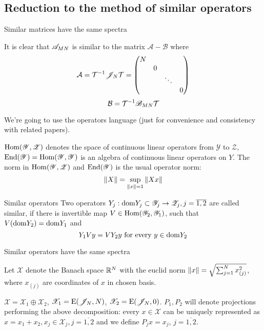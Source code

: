 \documentclass{article}
\begin{document}
\subsection{Reduction to the method of similar operators}

\begin{propose}
    Similar matrices have the same spectra
\end{propose}

It is clear that \( \mathscr{A}_{{M}{N}} \) is similar to the matrix \( \mathcal A - \mathcal B \) where
\[\mathcal A = {\mathcal T}^{-1}{\mathscr{J}_{N}}{\mathcal T}
= \begin{pmatrix}
    N &   &        & \\
      & 0 &        & \\
      &   & \ddots & \\
      &   &        & 0
\end{pmatrix}\]
\[\mathcal B = {\mathcal T}^{-1}{\mathscr{B}_{{M}{N}}}{\mathcal T}\]


We're going to use the operators language (just for convenience and consistency with related papers).

\( \mathrm{Hom}({\mathscr Y},{\mathscr Z}) \) denotes the space of continuous linear operators
from \( \mathscr Y \) to \( \mathscr Z \),
\( \mathrm{End}({\mathscr Y}) = \mathrm{Hom}({\mathscr Y},{\mathscr Y}) \) is an algebra of continuous linear operators on \( Y \).
The norm in \( \mathrm{Hom}({\mathscr Y},{\mathscr Z}) \) and \( \mathrm{End}({\mathscr Y}) \) is the usual operator norm:
\[\left\|{X}\right\| = \sup_{\left\|{x}\right\| = 1}{\left\|{X x}\right\|}\]
\begin{dfn}{Similar operators}
    Two operators \( Y_j:\mathrm{dom} {Y_j}\subset\mathscr Y_j\to\mathscr Z_j, j=\overline{1,2} \) are called similar,
    if there is invertible map \( V\in\mathrm{Hom}({\mathscr Y_2},{\mathscr Y_1}) \),
    such that \( V(\mathrm{dom} {Y_2}) = \mathrm{dom} {Y_1} \) and
    \[Y_1 V y = V Y_2 y \text{ for every } y\in\mathrm{dom} {Y_2}\]
\end{dfn}
\begin{propose}
    Similar operators have the same spectra
\end{propose}

Let \( \mathscr X \) denote the Banach space \( \mathbb{R}^N \) with the euclid norm
\( \left\|{x}\right\| = \sqrt{\sum_{j=1}^N x_{(j)}^2} \), where \( x_{(j)} \) are coordinates of \( x \) in chosen basis.

\( \mathscr X = \mathscr X_1 \oplus \mathscr X_2 \),
\( \mathscr X_1 = \mathrm{E}({\mathscr{J}_{N}}, {N}) \),
\( \mathscr X_2 = \mathrm{E}({\mathscr{J}_{N}}, {0}) \).
\( P_1, P_2 \) will denote projections performing the above decomposition:
every \( x\in\mathscr X \) can be uniquely represented as \( x = x_1 + x_2, x_j\in\mathscr X_j,j=\overline{1,2} \)
and we define \( P_j x = x_j \), \( j=\overline{1,2} \).
\end{document}
